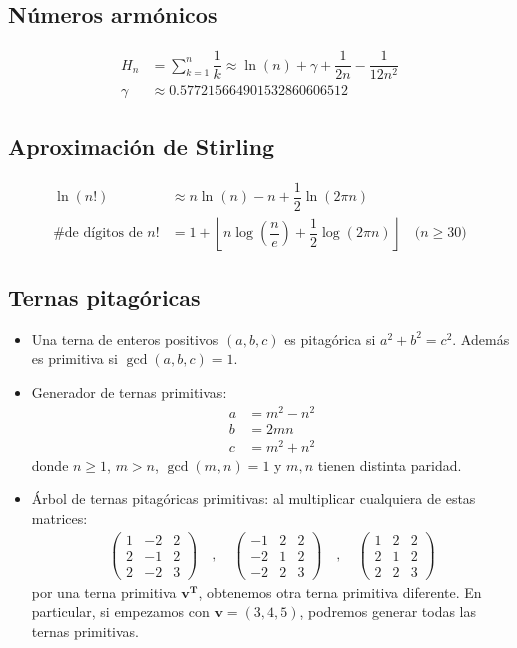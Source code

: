 \documentclass[11pt]{article}
\begin{document}
		\subsection{Números armónicos}
			\begin{align*}
				H_n &= \sum_{k=1}^{n} \dfrac{1}{k} \approx \ln(n) + \gamma + \dfrac{1}{2n} - \dfrac{1}{12n^2} \\
				\gamma &\approx 0.577215664901532860606512
			\end{align*}
		
		\subsection{Aproximación de Stirling}
			\begin{align*}
				\ln(n!) &\approx n\ln(n) - n + \dfrac{1}{2}\ln(2 \pi n) \\
				\text{\# de dígitos de $n!$} &= 1 + \left\lfloor n\log\left(\dfrac{n}{e}\right) + \dfrac{1}{2}\log(2 \pi n) \right\rfloor \quad \text{($n \geq 30$)}
			\end{align*}
		
		\subsection{Ternas pitagóricas}
			\begin{itemize}
				\item Una terna de enteros positivos $(a,b,c)$ es pitagórica si $a^2+b^2=c^2$. Además es primitiva si $\gcd(a,b,c)=1$.
				\item Generador de ternas primitivas:
				\begin{align*}
					a &= m^2-n^2 \\
					b &= 2mn \\
					c &= m^2+n^2
				\end{align*}
				donde $n \geq 1$, $m>n$, $\gcd(m,n)=1$ y $m,n$ tienen distinta paridad.
				\item Árbol de ternas pitagóricas primitivas: al multiplicar cualquiera de estas matrices:
				\begin{align*}
					\begin{pmatrix}
						1 & -2 & 2 \\
						2 & -1 & 2 \\
						2 & -2 & 3
					\end{pmatrix} \quad , \quad
					\begin{pmatrix}
						-1 & 2 & 2 \\
						-2 & 1 & 2 \\
						-2 & 2 & 3
					\end{pmatrix} \quad , \quad
					\begin{pmatrix}
						1 & 2 & 2 \\
						2 & 1 & 2 \\
						2 & 2 & 3
					\end{pmatrix}
				\end{align*}
				por una terna primitiva $\mathbf{v^T}$, obtenemos otra terna primitiva diferente. En particular, si empezamos con $\mathbf{v}=(3,4,5)$, podremos generar todas las ternas primitivas.
			\end{itemize}
	
\end{document}
